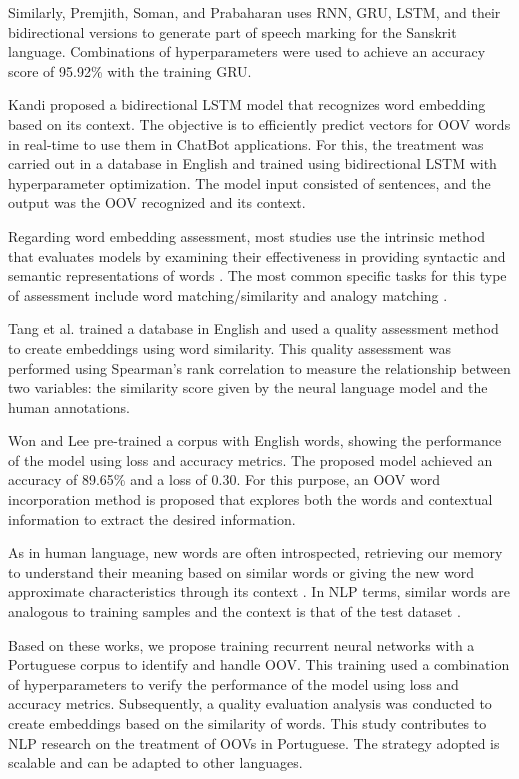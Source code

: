 \documentclass[conference]{IEEEtran}
\begin{document}
Similarly, Premjith, Soman, and Prabaharan \cite{b6} uses RNN, GRU, LSTM, and their bidirectional versions to generate part of speech marking for the Sanskrit language. Combinations of hyperparameters were used to achieve an accuracy score of 95.92\% with the training GRU.

Kandi \cite{b7} proposed a bidirectional LSTM model that recognizes word embedding based on its context. The objective is to efficiently predict vectors for OOV words in real-time to use them in ChatBot applications. For this, the treatment was carried out in a database in English and trained using bidirectional LSTM with hyperparameter optimization. The model input consisted of sentences, and the output was the OOV recognized and its context.

Regarding word embedding assessment, most studies use the intrinsic method that evaluates models by examining their effectiveness in providing syntactic and semantic representations of words \cite{b17}. The most common specific tasks for this type of assessment include word matching/similarity and analogy matching \cite{b17}.

Tang et al. \cite{b13} trained a database in English and used a quality assessment method to create embeddings using word similarity. This quality assessment was performed using Spearman's rank correlation to measure the relationship between two variables: the similarity score given by the neural language model and the human annotations.

Won and Lee \cite{b14} pre-trained a corpus with English words, showing the performance of the model using loss and accuracy metrics. The proposed model achieved an accuracy of 89.65\% and a loss of 0.30. For this purpose, an OOV word incorporation method is proposed that explores both the words and contextual information to extract the desired information.

As in human language, new words are often introspected, retrieving our memory to understand their meaning based on similar words or giving the new word approximate characteristics through its context \cite{b20}. In NLP terms, similar words are analogous to training samples and the context is that of the test dataset \cite{b20}.

Based on these works, we propose training recurrent neural networks with a Portuguese corpus to identify and handle OOV. This training used a combination of hyperparameters to verify the performance of the model using loss and accuracy metrics. Subsequently, a quality evaluation analysis was conducted to create embeddings based on the similarity of words. This study contributes to NLP research on the treatment of OOVs in Portuguese. The strategy adopted is scalable and can be adapted to other languages.
\end{document}
